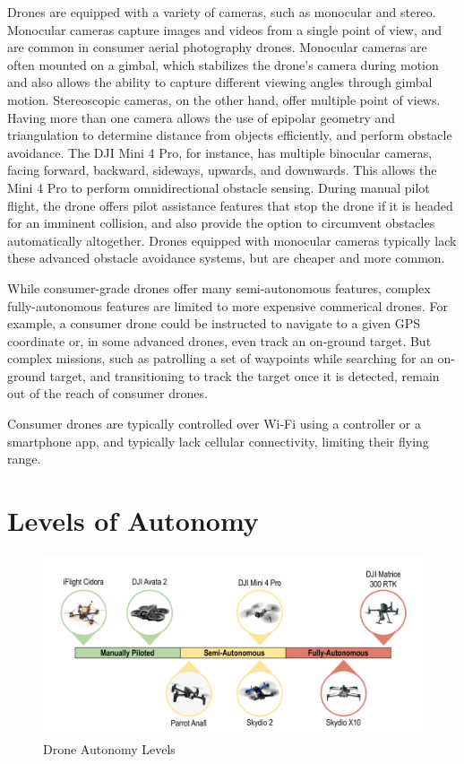 Drones are equipped with a variety of cameras, such as monocular and stereo.
Monocular cameras capture images and videos from a single point of view, and
are common in consumer aerial photography drones. Monocular cameras are often
mounted on a gimbal, which stabilizes the drone's camera during motion and also
allows the ability to capture different viewing angles through gimbal motion.
Stereoscopic cameras, on the other hand, offer multiple point of views. Having
more than one camera allows the use of epipolar geometry and triangulation to
determine distance from objects efficiently, and perform obstacle avoidance.
The DJI Mini 4 Pro, for instance, has multiple binocular cameras, facing
forward, backward, sideways, upwards, and downwards. This allows the Mini 4 Pro
to perform omnidirectional obstacle sensing. During manual pilot flight, the
drone offers pilot assistance features that stop the drone if it is headed for
an imminent collision, and also provide the option to circumvent obstacles
automatically altogether. Drones equipped with monocular cameras typically lack
these advanced obstacle avoidance systems, but are cheaper and more common.

While consumer-grade drones offer many semi-autonomous features, complex
fully-autonomous features are limited to more expensive commerical drones.  For
example, a consumer drone could be instructed to navigate to a given GPS
coordinate or, in some advanced drones, even track an on-ground target. But
complex missions, such as patrolling a set of waypoints while searching for an
on-ground target, and transitioning to track the target once it is detected,
remain out of the reach of consumer drones.

Consumer drones are typically controlled over Wi-Fi using a controller or a
smartphone app, and typically lack cellular connectivity, limiting their
flying range.

\section{Levels of Autonomy}

\begin{figure}[htbp]
\centerline{\includegraphics[width = .8\textwidth]{figs/autonomy-spectrum.pdf}}
\caption{Drone Autonomy Levels}
\label{fig:drone-autonomy-spectrum}
\end{figure}

